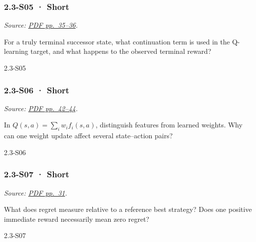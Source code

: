 \noindent\begin{minipage}{\linewidth}

\subsubsection{2.3-S05 · Short}\label{s05-short-5}

\emph{Source:
\href{../Lecture\%20Slides/2.3.\%20Q-learning.pdf\#page=35}{PDF
pp.~35--36}.}

For a truly terminal successor state, what continuation term is used in
the Q-learning target, and what happens to the observed terminal reward?

\begin{solution}[20mm]{2.3-S05}

\end{solution}
\end{minipage}\par\medskip

\noindent\begin{minipage}{\linewidth}

\subsubsection{2.3-S06 · Short}\label{s06-short-5}

\emph{Source:
\href{../Lecture\%20Slides/2.3.\%20Q-learning.pdf\#page=42}{PDF
pp.~42--44}.}

In \(Q(s,a)=\sum_i w_i f_i(s,a)\), distinguish features from learned
weights. Why can one weight update affect several state--action pairs?

\begin{solution}[20mm]{2.3-S06}

\end{solution}
\end{minipage}\par\medskip

\noindent\begin{minipage}{\linewidth}

\subsubsection{2.3-S07 · Short}\label{s07-short-5}

\emph{Source:
\href{../Lecture\%20Slides/2.3.\%20Q-learning.pdf\#page=31}{PDF
pp.~31}.}

What does regret measure relative to a reference best strategy? Does one
positive immediate reward necessarily mean zero regret?

\begin{solution}[20mm]{2.3-S07}

\end{solution}
\end{minipage}\par\medskip

